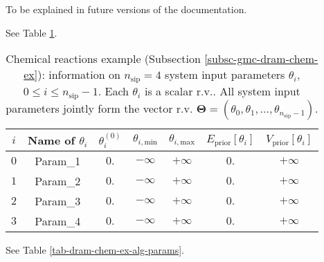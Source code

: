 To be explained in future versions of the documentation.

See Table \ref{tab-dram-chem-ex-sys-input-params}.

\begin{table}[h!]
\begin{center}
\begin{tabular}{|c|c|c|c|c|c|c|}
\hline
 $i$      & Name of $\theta_i$ & $\theta_i^{(0)}$ & $\theta_{i,\text{min}}$ & $\theta_{i,\text{max}}$ & $E_{\text{prior}}[\theta_i]$ & $V_{\text{prior}}[\theta_i]$ \\
\hline
\hline
 $0$      & Param\_1           & $0.$             & $-\infty$               & $+\infty$               & $0.$          & $+\infty$     \\
\hline
 $1$      & Param\_2           & $0.$             & $-\infty$               & $+\infty$               & $0.$          & $+\infty$     \\
\hline
 $2$      & Param\_3           & $0.$             & $-\infty$               & $+\infty$               & $0.$          & $+\infty$     \\
\hline
 $3$      & Param\_4           & $0.$             & $-\infty$               & $+\infty$               & $0.$          & $+\infty$     \\
\hline
\end{tabular}
\caption{Chemical reactions example (Subsection \ref{subsc-gmc-dram-chem-ex}):
information on $n_{\text{sip}}=4$ system input parameters $\theta_i$, $0\leqslant i\leqslant n_{\text{sip}}-1$.
Each $\theta_i$ is a scalar r.v.. All system input parameters jointly form the vector r.v. $\boldsymbol{\Theta}=(\theta_0,\theta_1,\ldots,\theta_{n_{\text{sip}}-1})$.
}
\label{tab-dram-chem-ex-sys-input-params}
\end{center}
\end{table}

See Table \ref{tab-dram-chem-ex-alg-params}.

